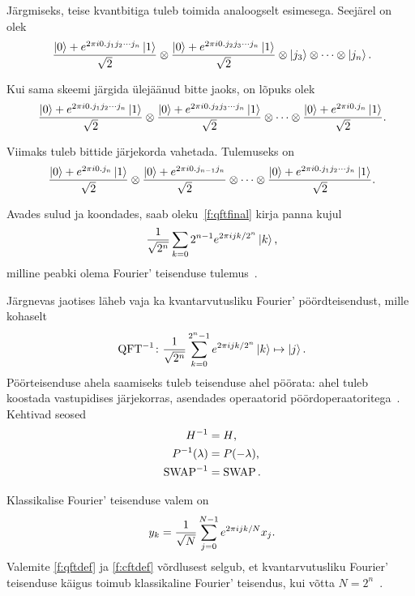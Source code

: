 \documentclass[12pt]{report}
\def\ket#1{\mathinner{|#1\rangle}}
\def\SWAP{\mathop{\rm SWAP}\nolimits}
\def\QFT{\mathop{\rm QFT}\nolimits}
\begin{document}
Järgmiseks, teise kvantbitiga tuleb toimida analoogselt esimesega.
Seejärel on olek
\begin{align}
    \frac{\ket{0} + e^{2\pi i0.j_1j_2\cdots j_n}\ket{1}}{\sqrt{2}}
    \otimes \frac{\ket{0} + e^{2\pi i0.j_2j_3\cdots j_n}\ket{1}}{\sqrt{2}}
    \otimes \ket{j_3} \otimes \cdots \otimes \ket{j_n} \rlap{.}
\end{align}

Kui sama skeemi järgida ülejäänud bitte jaoks, on lõpuks olek
\begin{align}
    \frac{\ket{0} + e^{2\pi i0.j_1j_2\cdots j_n}\ket{1}}{\sqrt{2}}
    \otimes \frac{\ket{0} + e^{2\pi i0.j_2j_3\cdots j_n}\ket{1}}{\sqrt{2}}
    \otimes \cdots
    \otimes \frac{\ket{0} + e^{2\pi i0.j_n}\ket{1}}{\sqrt{2}} \rlap{.}
\end{align}

Viimaks tuleb bittide järjekorda vahetada.
Tulemuseks on
\begin{align}\label{f:qftfinal}
    \frac{\ket{0} + e^{2\pi i0.j_n}\ket{1}}{\sqrt{2}}
    \otimes \frac{\ket{0} + e^{2\pi i0.j_{n-1}j_n}}{\sqrt{2}}
    \otimes \cdots
    \otimes \frac{\ket{0} + e^{2\pi i0.j_1j_2\cdots j_n}\ket{1}}{\sqrt{2}} \rlap{.}
\end{align}

Avades sulud ja koondades, saab oleku~\ref{f:qftfinal} kirja panna kujul
\begin{equation}\label{f:qftfinaltrans}
    \frac{1}{\sqrt{2^n}}\sum_{k=0}2^{n-1}e^{2\pi ijk/2^n}\ket k \rlap{,}
\end{equation}
milline peabki olema Fourier' teisenduse tulemus~\cite{nielsen+chuang, kaye+laflamme+mosca}.

Järgnevas jaotises läheb vaja ka kvantarvutusliku Fourier' pöördteisendust, mille kohaselt
\begin{align}
    \QFT^{-1}\colon
    \frac{1}{\sqrt{2^n}} \sum_{k=0}^{2^n-1} e^{2\pi ijk/2^n} \ket{k} \mapsto \ket{j} \rlap{.}
\end{align}
Pöörteisenduse ahela saamiseks tuleb teisenduse ahel pöörata: ahel tuleb koostada vastupidises järjekorras, asendades operaatorid pöördoperaatoritega~\cite{kaye+laflamme+mosca}.
Kehtivad seosed
\begin{align}
    H^{-1} &= H \rlap{,} \\
    P^{-1}(\lambda) &= P(-\lambda) \rlap{,} \\
    \SWAP^{-1} &= \SWAP \rlap{.}
\end{align}

Klassikalise Fourier' teisenduse valem on
\begin{align}\label{f:cftdef}
    y_k = \frac{1}{\sqrt{N}} \sum_{j=0}^{N-1}e^{2\pi ijk/N} x_j \rlap{.}
\end{align}
Valemite \eqref{f:qftdef} ja \ref{f:cftdef} võrdlusest selgub, et kvantarvutusliku Fourier' teisenduse käigus toimub klassikaline Fourier' teisendus, kui võtta \(N = 2^n\)~\cite{nielsen+chuang}.
\end{document}
